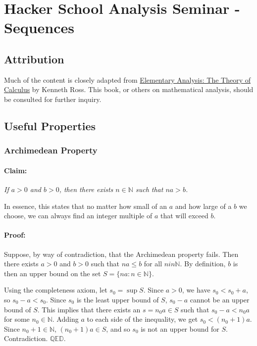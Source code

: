 \documentclass[]{article}
\author{}
\date{}
\begin{document}
\section{Hacker School Analysis Seminar - Sequences}

\subsection{Attribution}

Much of the content is closely adapted from
\href{http://books.google.com/books/about/Elementary_Analysis.html?id=ZDaSnKr_k5sC}{Elementary
Analysis: The Theory of Calculus} by Kenneth Ross. This book, or others
on mathematical analysis, should be consulted for further inquiry.

\subsection{Useful Properties}

\subsubsection{Archimedean Property}

\paragraph{Claim:}

\emph{If $a>0$ and $b>0$, then there exists $n \in \mathbb{N}$ such that
$na > b$.}

In essence, this states that no matter how small of an $a$ and how large
of a $b$ we choose, we can always find an integer multiple of $a$ that
will exceed $b$.

\paragraph{Proof:}

Suppose, by way of contradiction, that the Archimedean property fails.
Then there exists $a>0$ and $b>0$ such that $na \le b$ for all
$n in \mathbb{N}$. By definition, $b$ is then an upper bound on the set
$S = \{na : n \in \mathbb{N}\}$.

Using the completeness axiom, let $s_0 = \sup S$. Since $a > 0$, we have
$s_0 < s_0 + a$, so $s_0 - a < s_0$. Since $s_0$ is the least upper
bound of $S$, $s_0 - a$ cannot be an upper bound of $S$. This implies
that there exists an $s = n_0 a \in S$ such that $s_0 - a < n_0 a$ for
some $n_0 \in \mathbb{N}$. Adding $a$ to each side of the inequality, we
get $s_0 < (n_0 + 1) a$. Since $n_0 + 1 \in \mathbb{N}$,
$(n_0 +1) a \in S$, and so $s_0$ is not an upper bound for $S$.
Contradiction. $\mathbb{QED}$.
\end{document}
